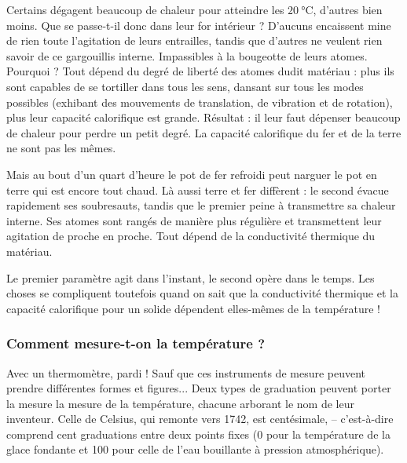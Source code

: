 Certains dégagent beaucoup de chaleur pour atteindre les \(\SI{20}{\degreeCelsius}\), d'autres bien moins. Que se passe-t-il donc dans leur for intérieur ? D'aucuns encaissent mine de rien toute l'agitation de leurs entrailles, tandis que d'autres ne veulent rien savoir de ce gargouillis interne. Impassibles à la bougeotte de leurs atomes. Pourquoi ? Tout dépend du degré de liberté des atomes dudit matériau : plus ils sont capables de se tortiller dans tous les sens, dansant sur tous les modes possibles (exhibant des mouvements de translation, de vibration et de rotation), plus leur capacité calorifique est grande. Résultat : il leur faut dépenser beaucoup de chaleur pour perdre un petit degré. La capacité calorifique du fer et de la terre ne sont pas les mêmes.

Mais au bout d'un quart d'heure le pot de fer refroidi peut narguer le pot en terre qui est encore tout chaud. Là aussi terre et fer diffèrent : le second évacue rapidement ses soubresauts, tandis que le premier peine à transmettre sa chaleur interne. Ses atomes sont rangés de manière plus régulière et transmettent leur agitation de proche en proche. Tout dépend de la conductivité thermique du matériau.

Le premier paramètre agit dans l'instant, le second opère dans le temps. Les choses se compliquent toutefois quand on sait que la conductivité thermique et la capacité calorifique pour un solide dépendent elles-mêmes de la température !

\subsubsection{Comment mesure-t-on la température ?}

Avec un thermomètre, pardi ! Sauf que ces instruments de mesure peuvent prendre différentes formes et figures... Deux types de graduation peuvent porter la mesure la mesure de la température, chacune arborant le nom de leur inventeur. Celle de Celsius, qui remonte vers 1742, est centésimale, -- c'est-à-dire comprend cent graduations entre deux points fixes (0 pour la température de la glace fondante et 100 pour celle de l'eau bouillante à pression atmosphérique).

